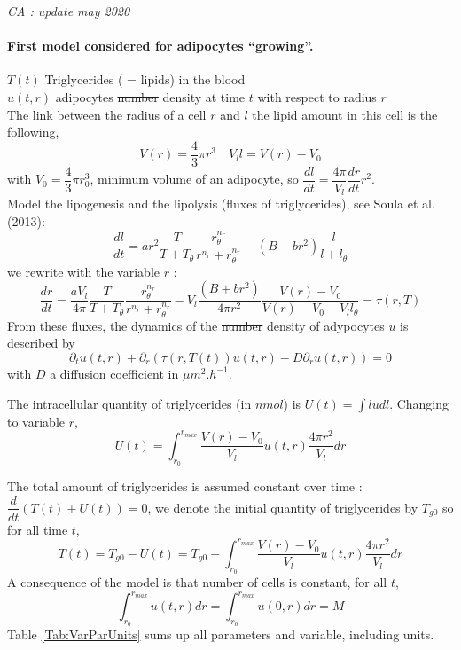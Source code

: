\documentclass[11pt,a4paper]{article}
\newcommand{\CA}[1]{{\color{mypurple} \emph{CA : #1} }}
\begin{document}
\CA{update may 2020}

\paragraph{First model considered for adipocytes ``growing''.\\}
$T(t)$ Triglycerides ( = lipids) in the blood\\
$u(t,r)$ adipocytes \sout{number} density at time $t$ with respect to radius $r$\\
The link between the radius of a cell $r$ and $l$ the lipid amount in this cell is the following,
$$V(r) = \dfrac{4}{3} \pi r^3 \quad V_l l = V(r) - V_{0}$$
with $V_{0} = \dfrac{4}{3} \pi r_{0}^3$, minimum volume of an adipocyte, so $\dfrac{dl}{dt} = \dfrac{4\pi}{V_l} \dfrac{dr}{dt} r^2$.\\

Model the lipogenesis and the lipolysis (fluxes of triglycerides), see Soula et al. (2013): 
$$\dfrac{dl}{dt} = a r^2 \dfrac{T}{T + T_{\theta}} \dfrac{r_{\theta}^{n_r}}{r^{n_r}+r_{\theta}^{n_r}} - (B + br^2) \dfrac{l}{l + l_{\theta}}$$
we rewrite with the variable $r$ : 
$$\dfrac{dr}{dt} = \dfrac{aV_l}{4\pi}  \dfrac{T}{T + T_{\theta}} \dfrac{r_{\theta}^{n_r}}{r^{n_r}+ r_{\theta}^{n_r}} - V_l \dfrac{(B + br^2)}{4\pi r^2} \dfrac{V(r) - V_0}{V(r) - V_0 + V_l  l_{\theta}} = \tau(r, T)$$
From these fluxes, the dynamics of the \sout{number} density of adypocytes $u$ is described by 
$$\partial_t u(t, r) + \partial_r( \tau(r, T(t)) u(t,r) - D \partial_r u(t,r)) = 0$$
with $D$ a diffusion coefficient in $\mu m^2 . h^{-1}$.

The intracellular quantity of triglycerides (in $nmol$) is $U(t) = \displaystyle \int l u dl$. Changing to variable $r$, 
$$U(t) = \int_{r_0}^{r_{max}} \dfrac{V(r) - V_0}{V_l} u(t, r) \dfrac{4\pi r^2}{V_l} dr$$

The total amount of triglycerides is assumed constant over time : $\dfrac{d}{dt}(T(t) + U(t)) = 0$, we denote the initial quantity of triglycerides by $T_{g0}$ so for all time $t$, $$T(t) = T_{g0} - U(t) =  T_{g0} - \int_{r_0}^{r_{max}} \dfrac{V(r) - V_0}{V_l} u(t, r) \dfrac{4\pi r^2}{V_l} dr$$
A consequence of the model is that number of cells is constant, for all $t$, $$ \displaystyle \int_{r_0}^{r_{max}} u(t, r) dr = \displaystyle \int_{r_0}^{r_{max}} u(0, r) dr = M $$ 
Table \ref{Tab:VarParUnits} sums up all parameters and variable, including units.
\end{document}
